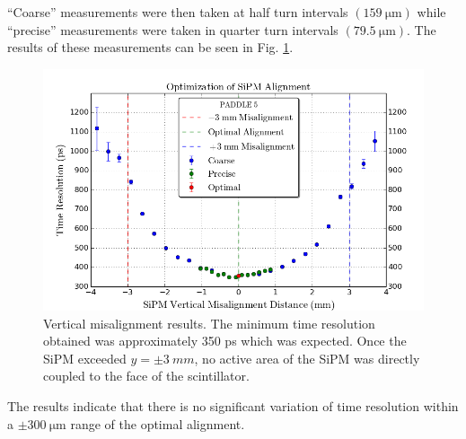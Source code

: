 ``Coarse'' measurements were then taken at half turn intervals $(159\ \mathrm{\mu m})$ while ``precise'' measurements were taken in quarter turn intervals $(79.5\ \mathrm{\mu m})$.  The results of these measurements can be seen in Fig. \ref{fig:sipm_va_coarse}.
	\begin{figure}[!htb]
		\centering
		\includegraphics[width=1.0\columnwidth]{misalignment/figs/sipm_va_coarse}
		\caption{Vertical misalignment results.  The minimum time resolution obtained was approximately 350 ps which was expected.  Once the SiPM exceeded $y = \pm 3\ mm$, no active area of the SiPM was directly coupled to the face of the scintillator.}
		\label{fig:sipm_va_coarse}
	\end{figure}
The results indicate that there is no significant variation of time resolution within a $\pm 300\ \mathrm{\mu m}$ range of the optimal alignment.  

